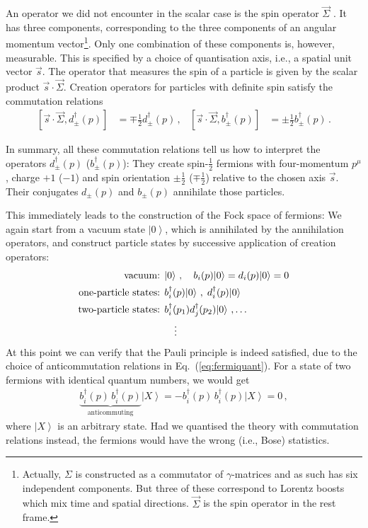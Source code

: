 \documentclass[12pt]{report}
\newcommand{\ket}[1]{\ensuremath{\!\left| #1 \right\rangle}}
\newcommand{\2}{\ensuremath{\sqrt{2}\,}}
\begin{document}
{      An operator we did not encounter in the scalar case is the spin operator $\vec{\Sigma}$
      . It 
      has three components, corresponding to the three components of an angular momentum
      vector\footnote{Actually, $\Sigma$ is constructed as a commutator of $\gamma$-matrices and as
        such has six independent components. But three of these correspond to Lorentz boosts which
        mix time and spatial directions. $\vec{\Sigma}$ is the spin operator in the rest frame.}. Only
      one combination of these components is, however, measurable. This is specified by a choice of
      quantisation axis, i.e., a spatial unit vector $\vec{s}$. The operator that measures the spin
      of a particle is given by the scalar product $\vec{s}\cdot\vec{\Sigma}$. Creation operators
      for particles with definite spin satisfy the commutation relations
      \begin{align}
        \left[\vec{s}\cdot\vec{\Sigma}, d_\pm^\dagger(p) \right]&= \mp\frac{1}{2}
        d_\pm^\dagger(p)\,, & \left[\vec{s}\cdot\vec{\Sigma}, b_\pm^\dagger(p) \right]&= \pm\frac{1}{2}
        b_\pm^\dagger(p)\,.
      \end{align}
      
      In summary, all these commutation relations tell us how to interpret the operators 
      $d_\pm^\dagger(p)$
      ($b_\pm^\dagger(p)$): They create spin-$\frac{1}{2}$ fermions with four-momentum $p^\mu$,
      charge $+1$ ($-1$) and spin orientation $\pm\frac{1}{2}$ ($\mp\frac{1}{2}$) relative to the
      chosen axis $\vec{s}$. Their conjugates $d_\pm(p)$ and $b_\pm(p)$ annihilate those particles.

      This immediately leads to the construction of the Fock space of fermions: We again start from
      a vacuum state $\ket{0}$, which is annihilated by the annihilation operators, and construct
      particle states by successive application of creation operators: 
      \begin{align*}\index{Hilbert space!for the spinor field}
        \text{vacuum: }              &\ket{0}\,,\quad b_i(p)\ket{0}=d_i(p)\ket{0}=0\\ 
        \text{one-particle states: } & b_i^\dagger(p)\ket{0}\,,\;d_i^\dagger(p)\ket{0} \\
        \text{two-particle states: } & b_i^\dagger(p_1)d_j^\dagger(p_2)\ket{0}\,,\ldots\\
        &\quad\vdots
      \end{align*}
      At this point we can verify that the Pauli principle is indeed
      satisfied, due to the choice of anticommutation relations in Eq.~(\ref{eq:fermiquant}). For a
      state of two fermions with identical quantum numbers, we would get
      \begin{align}
        \underbrace{b_i^\dagger(p) \,b_i^\dagger(p)}_{\text{anticommuting}} \ket{X} =
        -b_i^\dagger(p) \,b_i^\dagger(p) \ket{X}=0 \,,
      \end{align}
      where $\ket{X}$ is an arbitrary state.
      Had we quantised the theory with commutation relations
      instead, the fermions would have the wrong (i.e., Bose) statistics.

}
\end{document}
